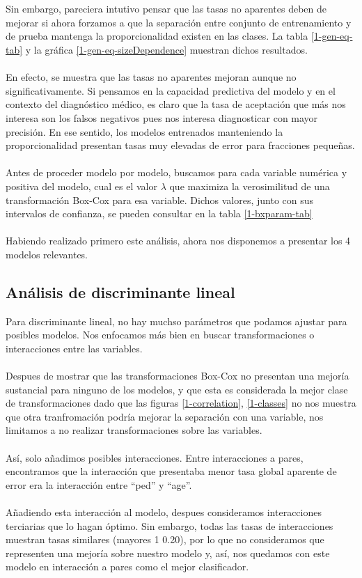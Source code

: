 \documentclass[11pt]{article}
\begin{document}
\\
\\Sin embargo, pareciera intutivo pensar que las tasas no aparentes deben de mejorar si ahora forzamos a que la separación entre conjunto de entrenamiento y de prueba mantenga la proporcionalidad existen en las clases. La tabla \ref{1-gen-eq-tab} y la gráfica \ref{1-gen-eq-sizeDependence} muestran dichos resultados.
\\
\\En efecto, se muestra que las tasas no aparentes mejoran aunque no significativamente. Si pensamos en la capacidad predictiva del modelo y en el contexto del diagnóstico médico, es claro que la tasa de aceptación que más nos interesa son los falsos negativos pues nos interesa diagnosticar con mayor precisión. En ese sentido, los modelos entrenados manteniendo la proporcionalidad presentan tasas muy elevadas de error para fracciones pequeñas.
\\
\\Antes de proceder modelo por modelo, buscamos para cada variable numérica y positiva del modelo, cual es el valor $\lambda$ que maximiza la verosimilitud de una transformación Box-Cox para esa variable. Dichos valores, junto con sus intervalos de confianza, se pueden consultar en la tabla \ref{1-bxparam-tab}
\\
\\Habiendo realizado primero este análisis, ahora nos disponemos a presentar los 4 modelos relevantes.
\subsection{Análisis de discriminante lineal}
Para discriminante lineal, no hay muchso parámetros que podamos ajustar para posibles modelos. Nos enfocamos más bien en buscar transformaciones o interacciones entre las variables.
\\
\\Despues de mostrar que las transformaciones Box-Cox no presentan una mejoría sustancial para ninguno de los modelos, y que esta es considerada la mejor clase de transformaciones dado que las figuras \ref{1-correlation}, \ref{1-classes} no nos muestra que otra tranfromación podría mejorar la separación con una variable, nos limitamos a no realizar transformaciones sobre las variables.
\\
\\Así, solo añadimos posibles interacciones. Entre interacciones a pares, encontramos que la interacción que presentaba menor tasa global aparente de error era la interacción entre ``ped''  y  ``age''.
\\
\\Añadiendo esta interacción al modelo, despues consideramos interacciones terciarias que lo hagan óptimo. Sin embargo, todas las tasas de interacciones muestran tasas similares (mayores 1 0.20), por lo que no consideramos que representen una mejoría sobre nuestro modelo y, así, nos quedamos con este modelo en interacción a pares como el mejor clasificador.
\end{document}
